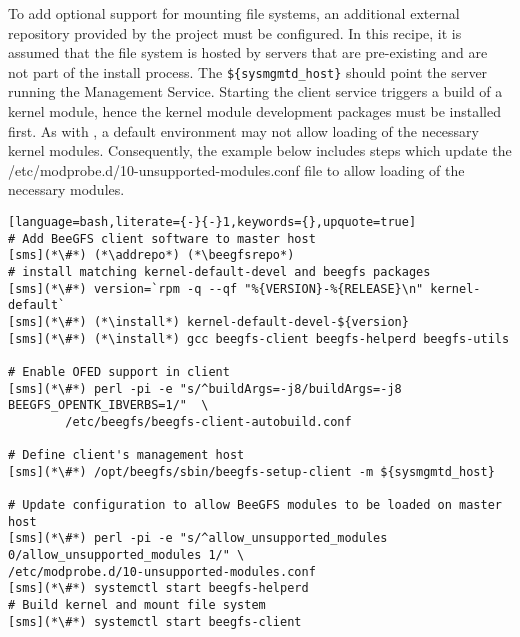 To add optional support for mounting \beegfs{} file systems, an 
additional external \pkgmgr{} repository provided by the \beegfs{} project must be 
configured.  In this recipe, it is
assumed that the file system is hosted by servers that are pre-existing
and are not part of the install process. The \texttt{\$\{sysmgmtd\_host\}} should
point the server running the \beegfs{} Management Service. Starting the client service triggers
a build of a kernel module, hence the kernel module development packages must be
installed first. As with \Lustre{}, a default \baseOS{} environment may not allow 
loading of the necessary \beegfs{} kernel modules. Consequently, the example below 
includes steps which update the /etc/modprobe.d/10-unsupported-modules.conf file 
to allow loading of the necessary modules.

\begin{lstlisting}[language=bash,literate={-}{-}1,keywords={},upquote=true]
# Add BeeGFS client software to master host
[sms](*\#*) (*\addrepo*) (*\beegfsrepo*)
# install matching kernel-default-devel and beegfs packages
[sms](*\#*) version=`rpm -q --qf "%{VERSION}-%{RELEASE}\n" kernel-default`
[sms](*\#*) (*\install*) kernel-default-devel-${version}
[sms](*\#*) (*\install*) gcc beegfs-client beegfs-helperd beegfs-utils

# Enable OFED support in client
[sms](*\#*) perl -pi -e "s/^buildArgs=-j8/buildArgs=-j8 BEEGFS_OPENTK_IBVERBS=1/"  \
        /etc/beegfs/beegfs-client-autobuild.conf

# Define client's management host
[sms](*\#*) /opt/beegfs/sbin/beegfs-setup-client -m ${sysmgmtd_host}

# Update configuration to allow BeeGFS modules to be loaded on master host
[sms](*\#*) perl -pi -e "s/^allow_unsupported_modules 0/allow_unsupported_modules 1/" \
/etc/modprobe.d/10-unsupported-modules.conf
[sms](*\#*) systemctl start beegfs-helperd
# Build kernel and mount file system
[sms](*\#*) systemctl start beegfs-client
\end{lstlisting}

